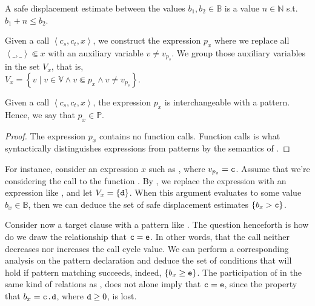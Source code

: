 \begin{definition} A safe displacement estimate between the values
$b_1,b_2\in\mathbb{B}$ is a value $n\in\mathbb{N}$ s.t. $b_1+n\leq
b_2$.\end{definition}

\begin{definition}\label{definition:source-variable} Given a call $\left\langle
c_s,c_t,x\right\rangle$, we construct the expression $p_x$ where we replace all
$\left\langle \_,\_ \right\rangle\Subset x$ with an auxiliary variable $v\neq
v_{p_s}$. We group those auxiliary variables in the set $V_x$, that is,\\ $V_x =
\left\{ v \mid v\in\mathbb{V} \wedge v\Subset p_x \wedge v \neq v_{p_s}
\right\}$.\end{definition} 

\begin{lemma} Given a call $\left\langle c_s,c_t,x\right\rangle$, the
expression $p_x$ is interchangeable with a pattern. Hence, we say that
$p_x\in\mathbb{P}.$\end{lemma}

\begin{proof} The expression $p_x$ contains no function calls. Function calls
is what syntactically distinguishes expressions from patterns by the semantics
of \D{}.\end{proof}

For instance, consider an expression $x$ such as , where
$v_{p_s}=\text{{\ttfamily c}}$. Assume that we're considering the call to the function
. By , we replace the expression
 with an expression like , and let $V_x = \left\{
\text{{\ttfamily d}} \right\}$. When this argument evaluates to some value
$b_x\in\mathbb{B}$, then we can deduce the set of safe displacement estimates
$\{b_x>\text{{\ttfamily c}}\}$.

Consider now a target clause with a pattern like . The question
henceforth is how do we draw the relationship that $\text{{\ttfamily c}}=\text{{\ttfamily e}}$. In
other words, that the call neither decreases nor increases the call cycle
value. We can perform a corresponding analysis on the pattern declaration and
deduce the set of conditions that will hold if pattern matching succeeds,
indeed, $\{b_x\geq \text{{\ttfamily e}}\}$. The participation of  in the same kind
of relations as , does not alone imply that $\text{{\ttfamily c}}=\text{{\ttfamily e}}$,
since the property that $b_x=\text{{\ttfamily c.d}}$, where $\text{{\ttfamily d}}\geq 0$, is lost.

